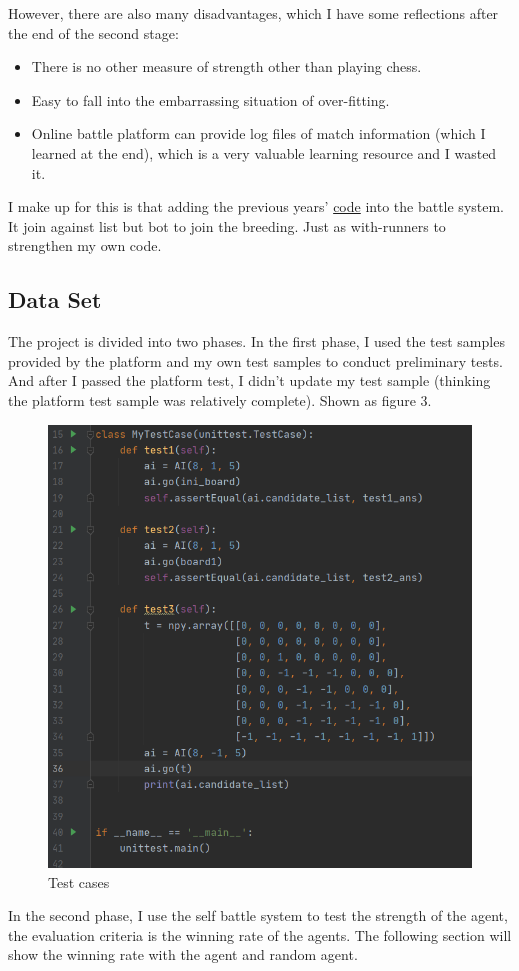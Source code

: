 \documentclass[conference,compsoc]{IEEEtran}
\begin{document}
However, there are also many disadvantages, which I have some reflections after the end of the second stage: 
\begin{itemize}
\item There is no other measure of strength other than playing chess.
\item Easy to fall into the embarrassing situation of over-fitting.
\item Online battle platform can provide log files of match information (which I learned at the end), which is a very valuable learning resource and I wasted it.
\end{itemize}  

I make up for this is that adding the previous years' \href{https://github.com/lethal233/CS303A-projects/tree/main/reversi}{code} into the battle system. It join against list but bot to join the breeding. Just as with-runners to strengthen my own code.

\subsection{Data Set}
The project is divided into two phases. In the first phase, I used the test samples provided by the platform and my own test samples to conduct preliminary tests. And after I passed the platform test, I didn't update my test sample (thinking the platform test sample was relatively complete). Shown as figure 3.

\begin{figure}[htbp]
\begin{center}
\includegraphics[width=.4\textwidth]{fig/tc.png}
\end{center}
\caption{Test cases}
\label{Fig3}
\end{figure}

In the second phase, I use the self battle system to test the strength of the agent, the evaluation criteria is the winning rate of the agents. The following section will show the winning rate with the agent and random agent.
\end{document}
